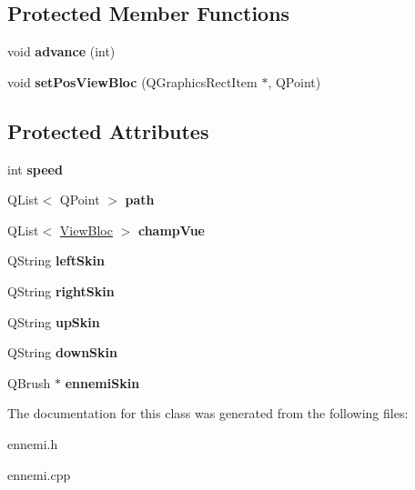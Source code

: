 \subsection*{Protected Member Functions}
\begin{DoxyCompactItemize}
\item 
\hypertarget{class_ennemi_afc6832bb7b5969ac0e13f87c643a5ce2}{}void {\bfseries advance} (int)\label{class_ennemi_afc6832bb7b5969ac0e13f87c643a5ce2}

\item 
\hypertarget{class_ennemi_ad68ed78a65bdade39ff0b1b55a190240}{}void {\bfseries set\+Pos\+View\+Bloc} (Q\+Graphics\+Rect\+Item $\ast$, Q\+Point)\label{class_ennemi_ad68ed78a65bdade39ff0b1b55a190240}

\end{DoxyCompactItemize}
\subsection*{Protected Attributes}
\begin{DoxyCompactItemize}
\item 
\hypertarget{class_ennemi_abf051ea1d034df4a8b0480e9387f2008}{}int {\bfseries speed}\label{class_ennemi_abf051ea1d034df4a8b0480e9387f2008}

\item 
\hypertarget{class_ennemi_a4ddf1ae5a5662a8206dc6f4a3aac6fbf}{}Q\+List$<$ Q\+Point $>$ {\bfseries path}\label{class_ennemi_a4ddf1ae5a5662a8206dc6f4a3aac6fbf}

\item 
\hypertarget{class_ennemi_ab6afa5e2cd63928656532a8c99fe64f8}{}Q\+List$<$ \hyperlink{struct_view_bloc}{View\+Bloc} $>$ {\bfseries champ\+Vue}\label{class_ennemi_ab6afa5e2cd63928656532a8c99fe64f8}

\item 
\hypertarget{class_ennemi_a5537ad37a49d572d09a76749238490c2}{}Q\+String {\bfseries left\+Skin}\label{class_ennemi_a5537ad37a49d572d09a76749238490c2}

\item 
\hypertarget{class_ennemi_ab63f4a7fbff796d8c368bd49e254561a}{}Q\+String {\bfseries right\+Skin}\label{class_ennemi_ab63f4a7fbff796d8c368bd49e254561a}

\item 
\hypertarget{class_ennemi_abe2b3007be5ed71b5547a66407b8db3e}{}Q\+String {\bfseries up\+Skin}\label{class_ennemi_abe2b3007be5ed71b5547a66407b8db3e}

\item 
\hypertarget{class_ennemi_a3a72c0537216823ea706923d20f9ed5a}{}Q\+String {\bfseries down\+Skin}\label{class_ennemi_a3a72c0537216823ea706923d20f9ed5a}

\item 
\hypertarget{class_ennemi_afed643ae9412716c1f1caabfdea06fc0}{}Q\+Brush $\ast$ {\bfseries ennemi\+Skin}\label{class_ennemi_afed643ae9412716c1f1caabfdea06fc0}

\end{DoxyCompactItemize}


The documentation for this class was generated from the following files\+:\begin{DoxyCompactItemize}
\item 
ennemi.\+h\item 
ennemi.\+cpp\end{DoxyCompactItemize}
